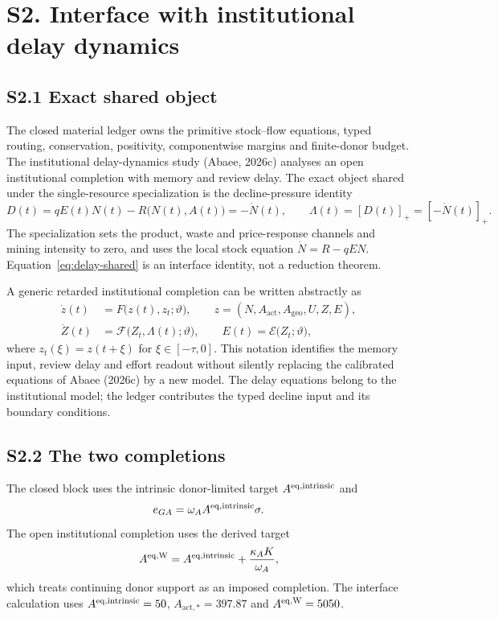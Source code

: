 \documentclass[11pt]{article}
\begin{document}
\section*{S2. Interface with institutional delay dynamics}

\subsection*{S2.1 Exact shared object}

The closed material ledger owns the primitive stock--flow equations, typed routing, conservation, positivity, componentwise margins and finite-donor budget. The institutional delay-dynamics study (Abaee, 2026c) analyses an open institutional completion with memory and review delay. The exact object shared under the single-resource specialization is the decline-pressure identity
\begin{equation}
D(t)=qE(t)N(t)-R\bigl(N(t),A(t)\bigr)=-\dot N(t),
\qquad
\Lambda(t)=[D(t)]_+=[-\dot N(t)]_+.
\label{eq:delay-shared}
\end{equation}
The specialization sets the product, waste and price-response channels and mining intensity to zero, and uses the local stock equation $\dot N=R-qEN$. Equation~\eqref{eq:delay-shared} is an interface identity, not a reduction theorem.

A generic retarded institutional completion can be written abstractly as
\begin{align}
\dot z(t)&=F\bigl(z(t),z_t;\vartheta\bigr),
\qquad z=(N,A_{\mathrm{act}},A_{\mathrm{geo}},U,Z,E),\\
\dot Z(t)&=\mathcal F\bigl(Z_t,\Lambda(t);\vartheta\bigr),
\qquad E(t)=\mathcal E\bigl(Z_t;\vartheta\bigr),
\end{align}
where $z_t(\xi)=z(t+\xi)$ for $\xi\in[-\tau,0]$. This notation identifies the memory input, review delay and effort readout without silently replacing the calibrated equations of Abaee (2026c) by a new model. The delay equations belong to the institutional model; the ledger contributes the typed decline input and its boundary conditions.

\subsection*{S2.2 The two completions}

The closed block uses the intrinsic donor-limited target $A^{\rm eq,intrinsic}$ and
\begin{equation}
e_{GA}=\omega_A A^{\rm eq,intrinsic}\sigma.
\end{equation}
The open institutional completion uses the derived target
\begin{equation}
A^{\rm eq,W}=A^{\rm eq,intrinsic}+\frac{\kappa_AK}{\omega_A},
\end{equation}
which treats continuing donor support as an imposed completion. The interface calculation uses $A^{\rm eq,intrinsic}=50$, $A_{\mathrm{act},*}=397.87$ and $A^{\rm eq,W}=5050$.
\end{document}
